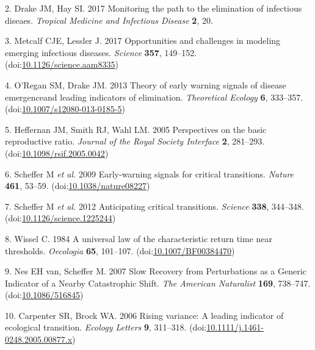 \documentclass[3p]{elsarticle} %
\begin{document}
\leavevmode\hypertarget{ref-Drake2017}{}%
2. Drake JM, Hay SI. 2017 Monitoring the path to the elimination of
infectious diseaes. \emph{Tropical Medicine and Infectious Disease}
\textbf{2}, 20.

\leavevmode\hypertarget{ref-Metcalf2017}{}%
3. Metcalf CJE, Lessler J. 2017 Opportunities and challenges in modeling
emerging infectious diseases. \emph{Science} \textbf{357}, 149--152.
(doi:\href{https://doi.org/10.1126/science.aam8335}{10.1126/science.aam8335})

\leavevmode\hypertarget{ref-ORegan2013}{}%
4. O'Regan SM, Drake JM. 2013 Theory of early warning signals of disease
emergenceand leading indicators of elimination. \emph{Theoretical
Ecology} \textbf{6}, 333--357.
(doi:\href{https://doi.org/10.1007/s12080-013-0185-5}{10.1007/s12080-013-0185-5})

\leavevmode\hypertarget{ref-Heffernan2005}{}%
5. Heffernan JM, Smith RJ, Wahl LM. 2005 Perspectives on the basic
reproductive ratio. \emph{Journal of the Royal Society Interface}
\textbf{2}, 281--293.
(doi:\href{https://doi.org/10.1098/rsif.2005.0042}{10.1098/rsif.2005.0042})

\leavevmode\hypertarget{ref-Scheffer2009}{}%
6. Scheffer M \emph{et al.} 2009 Early-warning signals for critical
transitions. \emph{Nature} \textbf{461}, 53--59.
(doi:\href{https://doi.org/10.1038/nature08227}{10.1038/nature08227})

\leavevmode\hypertarget{ref-Scheffer2012}{}%
7. Scheffer M \emph{et al.} 2012 Anticipating critical transitions.
\emph{Science} \textbf{338}, 344--348.
(doi:\href{https://doi.org/10.1126/science.1225244}{10.1126/science.1225244})

\leavevmode\hypertarget{ref-Wissel1984}{}%
8. Wissel C. 1984 A universal law of the characteristic return time near
thresholds. \emph{Oecologia} \textbf{65}, 101--107.
(doi:\href{https://doi.org/10.1007/BF00384470}{10.1007/BF00384470})

\leavevmode\hypertarget{ref-VanNes2007}{}%
9. Nes EH van, Scheffer M. 2007 Slow Recovery from Perturbations as a
Generic Indicator of a Nearby Catastrophic Shift. \emph{The American
Naturalist} \textbf{169}, 738--747.
(doi:\href{https://doi.org/10.1086/516845}{10.1086/516845})

\leavevmode\hypertarget{ref-Carpenter2006}{}%
10. Carpenter SR, Brock WA. 2006 Rising variance: A leading indicator of
ecological transition. \emph{Ecology Letters} \textbf{9}, 311--318.
(doi:\href{https://doi.org/10.1111/j.1461-0248.2005.00877.x}{10.1111/j.1461-0248.2005.00877.x})
\end{document}
